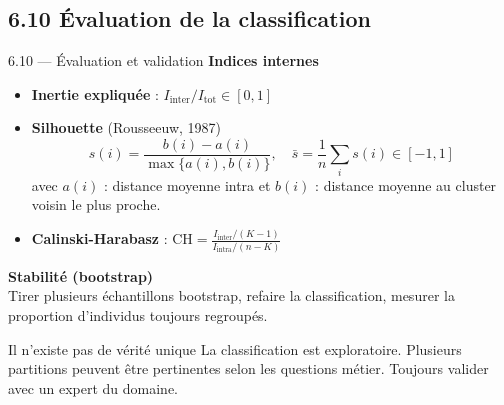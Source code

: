 \subsection{6.10 Évaluation de la classification}
\begin{frame}{6.10 — Évaluation et validation}
\textbf{Indices internes}\\[0.1cm]
\begin{itemize}\small
  \item \textbf{Inertie expliquée} : $I_{\text{inter}} / I_{\text{tot}} \in [0,1]$
  \item \textbf{Silhouette} (Rousseeuw, 1987)
        \[ s(i) = \frac{b(i) - a(i)}{\max\{a(i), b(i)\}}, \quad
           \bar{s} = \frac{1}{n}\sum_i s(i) \in [-1, 1] \]
        avec $a(i)$ : distance moyenne intra et $b(i)$ : distance moyenne au cluster voisin le plus proche.
  \item \textbf{Calinski-Harabasz} : $\text{CH} = \frac{I_{\text{inter}}/(K-1)}{I_{\text{intra}}/(n-K)}$
\end{itemize}

\textbf{Stabilité (bootstrap)}\\
\small Tirer plusieurs échantillons bootstrap, refaire la classification,
mesurer la proportion d'individus toujours regroupés.

\begin{alertblock}{Il n'existe pas de vérité unique}
\small La classification est \alert{exploratoire}. Plusieurs partitions peuvent
être pertinentes selon les questions métier. Toujours valider avec un expert
du domaine.
\end{alertblock}
\end{frame}

